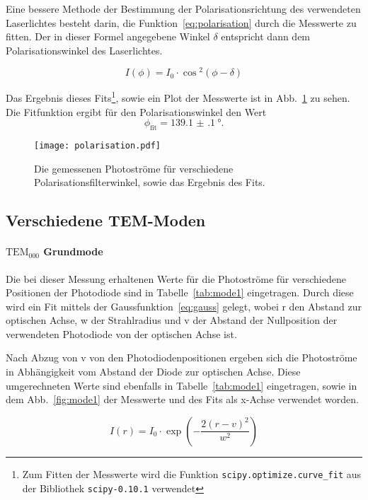 Eine bessere Methode der Bestimmung der Polarisationsrichtung des 
verwendeten Laserlichtes besteht darin, die 
Funktion~\eqref{eq:polarisation} durch die Messwerte zu fitten. Der 
in dieser Formel angegebene Winkel $\delta$ entspricht dann dem 
Polarisationswinkel des Laserlichtes.

%
\begin{equation}
I(\phi) = I_0 \cdot \cos{^2(\phi - \delta)}
\label{eq:polarisation}
\end{equation} 
%

Das Ergebnis dieses Fits\footnote{Zum Fitten der 
Messwerte wird die Funktion \texttt{scipy.optimize.curve\_fit} 
aus der Bibliothek \texttt{scipy-0.10.1} verwendet}, 
sowie ein Plot der Messwerte ist in Abb.~\ref{fig:polarisation} 
zu sehen. Die Fitfunktion ergibt für den Polarisationswinkel 
den Wert
\begin{equation}
\phi_\text{fit} = \SI{139.1(1)}{\degree}.
\end{equation}

%
\begin{figure}
\centering
  \texttt{[image: polarisation.pdf]}
  \caption{Die gemessenen Photoströme für verschiedene 
Polarisationsfilterwinkel, sowie das Ergebnis des Fits.}
\label{fig:polarisation}
\end{figure}
%
\subsection{Verschiedene TEM-Moden}
%
\paragraph{$\text{TEM}_{000}$ Grundmode}

Die bei dieser Messung erhaltenen Werte für die Photoströme 
für verschiedene Positionen der Photodiode sind in 
Tabelle~\ref{tab:mode1} eingetragen. 
Durch diese wird ein Fit mittels der Gaussfunktion~\eqref{eq:gauss} 
gelegt, wobei r den Abstand zur optischen Achse, w der Strahlradius 
und v der Abstand der Nullposition der verwendeten Photodiode von 
der optischen Achse ist.

Nach Abzug von v von den Photodiodenpositionen ergeben sich 
die Photoströme in Abhängigkeit vom Abstand der Diode zur 
optischen Achse. Diese umgerechneten Werte sind ebenfalls 
in Tabelle~\ref{tab:mode1} eingetragen, sowie in dem 
Abb.~\ref{fig:mode1} 
der Messwerte und des Fits als x-Achse verwendet worden.

\begin{equation}
I(r) = I_0 \cdot \exp{\left(-\frac{2(r-v)^2}{w^2}\right)}
\label{eq:gauss}
\end{equation}

